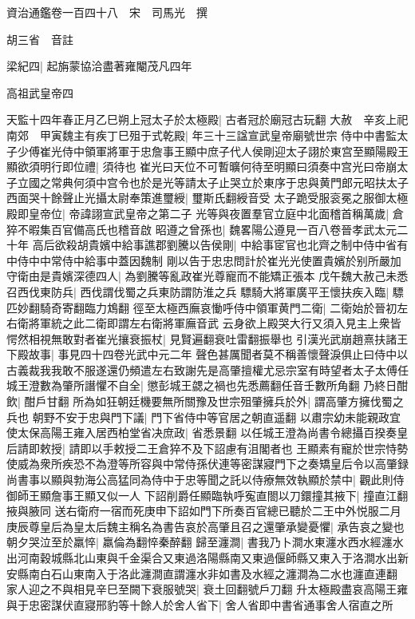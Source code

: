 資治通鑑卷一百四十八　宋　司馬光　撰

胡三省　音註

梁紀四|{
	起旃蒙協洽盡著雍閹茂凡四年}


高祖武皇帝四

天監十四年春正月乙巳朔上冠太子於太極殿|{
	古者冠於廟冠古玩翻}
大赦　辛亥上祀南郊　甲寅魏主有疾丁巳殂于式乾殿|{
	年三十三諡宣武皇帝廟號世宗}
侍中中書監太子少傅崔光侍中領軍將軍于忠詹事王顯中庶子代人侯剛迎太子詡於東宫至顯陽殿王顯欲須明行即位禮|{
	須待也}
崔光曰天位不可暫曠何待至明顯曰須奏中宫光曰帝崩太子立國之常典何須中宫令也於是光等請太子止哭立於東序于忠與黄門郎元昭扶太子西面哭十餘聲止光攝太尉奉策進璽綬|{
	璽斯氏翻綬音受}
太子跪受服衮冕之服御太極殿即皇帝位|{
	帝諱詡宣武皇帝之第二子}
光等與夜置羣官立庭中北面稽首稱萬歲|{
	倉猝不暇集百官備高氏也稽音啟}
昭遵之曾孫也|{
	魏畧陽公遵見一百八卷晉孝武太元二十年}
高后欲殺胡貴嬪中給事譙郡劉騰以告侯剛|{
	中給事宧官也北齊之制中侍中省有中侍中中常侍中給事中蓋因魏制}
剛以告于忠忠問計於崔光光使置貴嬪於别所嚴加守衛由是貴嬪深德四人|{
	為劉騰等亂政崔光尊寵而不能矯正張本}
戊午魏大赦己未悉召西伐東防兵|{
	西伐謂伐蜀之兵東防謂防淮之兵}
驃騎大將軍廣平王懷扶疾入臨|{
	驃匹妙翻騎奇寄翻臨力鴆翻}
徑至太極西廡哀慟呼侍中領軍黄門二衛|{
	二衛始於晉初左右衛將軍統之此二衛即謂左右衛將軍廡音武}
云身欲上殿哭大行又須入見主上衆皆愕然相視無敢對者崔光攘衰振杖|{
	見賢遍翻衰吐雷翻振舉也}
引漢光武崩趙熹扶諸王下殿故事|{
	事見四十四卷光武中元二年}
聲色甚厲聞者莫不稱善懷聲淚俱止曰侍中以古義裁我我敢不服遂還仍頻遣左右致謝先是高肇擅權尤忌宗室有時望者太子太傅任城王澄數為肇所譖懼不自全|{
	懲彭城王勰之禍也先悉薦翻任音壬數所角翻}
乃終日酣飲|{
	酣戶甘翻}
所為如狂朝廷機要無所關豫及世宗殂肇擁兵於外|{
	謂高肇方擁伐蜀之兵也}
朝野不安于忠與門下議|{
	門下省侍中等官居之朝直遥翻}
以肅宗幼未能親政宜使太保高陽王雍入居西柏堂省决庶政|{
	省悉景翻}
以任城王澄為尚書令總攝百揆奏皇后請即敕授|{
	請即以手敕授二王倉猝不及下詔慮有沮閣者也}
王顯素有寵於世宗恃勢使威為衆所疾恐不為澄等所容與中常侍孫伏連等密謀寢門下之奏矯皇后令以高肇録尚書事以顯與勃海公高猛同為侍中于忠等聞之託以侍療無效執顯於禁中|{
	觀此則侍御師王顯詹事王顯又似一人}
下詔削爵任顯臨執呼寃直閤以刀鐶撞其掖下|{
	撞直江翻掖與腋同}
送右衛府一宿而死庚申下詔如門下所奏百官總已聽於二王中外悦服二月庚辰尊皇后為皇太后魏主稱名為書告哀於高肇且召之還肇承變憂懼|{
	承告哀之變也}
朝夕哭泣至於羸悴|{
	羸倫為翻悴秦醉翻}
歸至瀍澗|{
	書我乃卜澗水東瀍水西水經瀍水出河南穀城縣北山東與千金渠合又東過洛陽縣南又東過偃師縣又東入于洛澗水出新安縣南白石山東南入于洛此瀍澗直謂瀍水非如書及水經之瀍澗為二水也瀍直連翻}
家人迎之不與相見辛巳至闕下衰服號哭|{
	衰土回翻號戶刀翻}
升太極殿盡哀高陽王雍與于忠密謀伏直寢邢豹等十餘人於舍人省下|{
	舍人省即中書省通事舍人宿直之所}
